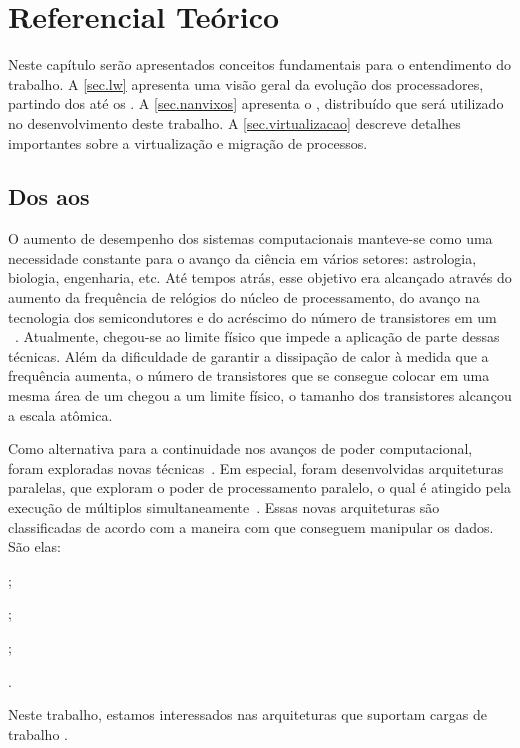 \glsresetall

\chapter{Referencial Teórico}
\label{chap.background}

Neste capítulo serão apresentados conceitos fundamentais para o entendimento do trabalho. A \autoref{sec.lw} apresenta uma visão geral da evolução dos processadores, partindo dos \singlecores até os \lws. A \autoref{sec.nanvixos} apresenta o \nanvix, \so distribuído que será utilizado no desenvolvimento deste trabalho. A \autoref{sec.virtualizacao} descreve detalhes importantes sobre a virtualização e migração de processos.

\section{Dos \singlecores aos \Lws}
\label{sec.lw}

O aumento de desempenho dos sistemas computacionais manteve-se como uma necessidade constante para o avanço da ciência em vários setores: astrologia, biologia, engenharia, etc. Até tempos atrás, esse objetivo era alcançado através do aumento da frequência de relógios do núcleo de processamento, do avanço na tecnologia dos semicondutores e do acréscimo do número de transistores em um \chip~\cite{amrouch2018negative}. Atualmente, chegou-se ao limite físico que impede a aplicação de parte dessas técnicas. Além da dificuldade de garantir a dissipação de calor à medida que a frequência aumenta, o número de transistores que se consegue colocar em uma mesma área de um \chip chegou a um limite físico, \ie o tamanho dos transistores alcançou a escala atômica.

Como alternativa para a continuidade nos avanços de poder computacional, foram exploradas novas técnicas~\cite{fuller2011computing,gepner2006multi}. Em especial, foram desenvolvidas arquiteturas paralelas, que exploram o poder de processamento paralelo, o qual é atingido pela execução de múltiplos \cores simultaneamente~\cite{gepner2006multi}. Essas novas arquiteturas são classificadas de acordo com a maneira com que conseguem manipular os dados. São elas:
\begin{inlinelist}
    \item \sisd;
    \item \simd;
    \item \misd;
    \item \mimd.
\end{inlinelist}
Neste trabalho, estamos interessados nas arquiteturas que suportam cargas de trabalho \mimd. 

